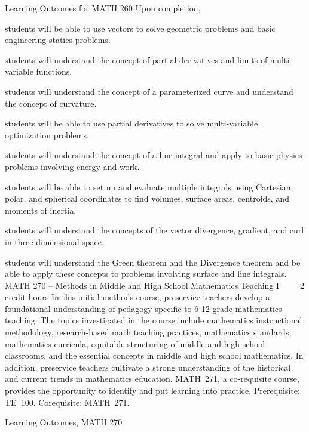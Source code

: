 Learning Outcomes for MATH 260
Upon completion, 
    \item students will be able to use vectors to solve geometric problems and basic engineering statics problems.
    \item students will understand the concept of partial derivatives and limits of multi-variable functions.
    \item students will understand the concept of a parameterized curve and understand the concept of curvature.
    \item students will be able to use partial derivatives to solve multi-variable optimization problems.
    \item students will understand the concept of a line integral and apply to basic physics problems involving energy and work.
    \item students will be able to set up and evaluate multiple integrals using Cartesian, polar, and spherical coordinates to find volumes, surface areas, centroids, and moments of inertia.
    \item students will understand the concepts of the vector divergence, gradient, and curl in three-dimensional space.
    \item students will understand the Green theorem and the Divergence theorem and be able to apply these concepts to problems involving surface and line integrals.
MATH 270 – Methods in Middle and High School Mathematics Teaching I     2 credit hours
In this initial methods course, preservice teachers develop a foundational understanding of pedagogy specific to 6-12 grade mathematics teaching. The topics investigated in the course include mathematics instructional methodology, research-based math teaching practices, mathematics standards, mathematics curricula, equitable structuring of middle and high school classrooms, and the essential concepts in middle and high school mathematics. In addition, preservice teachers cultivate a strong understanding of the historical and current trends in mathematics education. MATH 271, a co-requisite course, provides the opportunity to identify and put learning into practice.
Prerequisite: TE 100. 
Corequisite: MATH 271.

Learning Outcomes, MATH 270

